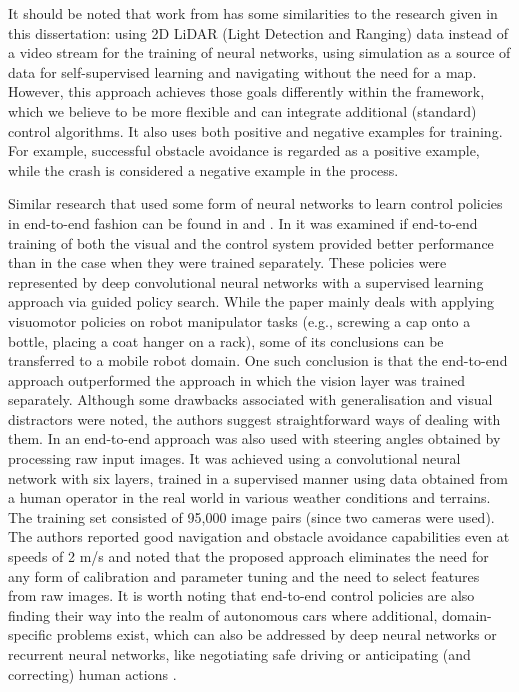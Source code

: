 It should be noted that work from \cite{Pfeiffer2017} has some similarities to the research given in this dissertation: using 2D LiDAR (Light Detection and Ranging) data instead of a video stream for the training of neural networks, using simulation as a source of data for self-supervised learning and navigating without the need for a map. However, this approach achieves those goals differently within the framework, which we believe to be more flexible and can integrate additional (standard) control algorithms. It also uses both positive and negative examples for training. For example, successful obstacle avoidance is regarded as a positive example, while the crash is considered a negative example in the process.

Similar research that used some form of neural networks to learn control policies in end-to-end fashion can be found in \cite{Levine2015} and \cite{Muller2006}. In \cite{Levine2015} it was examined if end-to-end training of both the visual and the control system provided better performance than in the case when they were trained separately. These policies were represented by deep convolutional neural networks with a supervised learning approach via guided policy search. While the paper mainly deals with applying visuomotor policies on robot manipulator tasks (e.g., screwing a cap onto a bottle, placing a coat hanger on a rack), some of its conclusions can be transferred to a mobile robot domain. One such conclusion is that the end-to-end approach outperformed the approach in which the vision layer was trained separately. Although some drawbacks associated with generalisation and visual distractors were noted, the authors suggest straightforward ways of dealing with them. In \cite{Muller2006} an end-to-end approach was also used with steering angles obtained by processing raw input images. It was achieved using a convolutional neural network with six layers, trained in a supervised manner using data obtained from a human operator in the real world in various weather conditions and terrains. The training set consisted of 95,000 image pairs (since two cameras were used). The authors reported good navigation and obstacle avoidance capabilities even at speeds of 2 m/s and noted that the proposed approach eliminates the need for any form of calibration and parameter tuning and the need to select features from raw images. It is worth noting that end-to-end control policies are also finding their way into the realm of autonomous cars \cite{Bojarski2016} where additional, domain-specific problems exist, which can also be addressed by deep neural networks or recurrent neural networks, like negotiating safe driving \cite{ShalevShwartz2016} or anticipating (and correcting) human actions \cite{Jain2016}.

